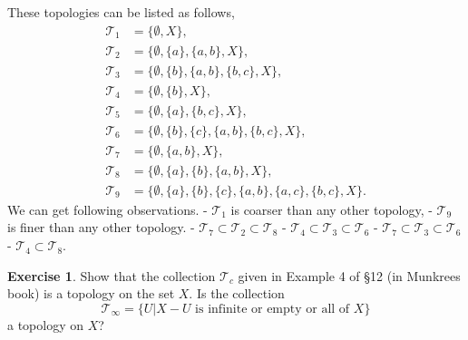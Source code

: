 \documentclass[
]{book}
\theoremstyle{definition}
\theoremstyle{definition}
\theoremstyle{definition}
\newtheorem{exercise}{Exercise}[chapter]
\theoremstyle{definition}
\theoremstyle{remark}
\begin{document}
These topologies can be listed as follows,
\begin{align*}
\mathcal{T}_1 &= \{\emptyset, X\}, \\
\mathcal{T}_2 &= \{\emptyset, \{a\}, \{a, b\}, X\}, \\
\mathcal{T}_3 &= \{\emptyset, \{b\}, \{a, b\}, \{b, c\}, X\}, \\
\mathcal{T}_4 &= \{\emptyset, \{b\}, X\}, \\
\mathcal{T}_5 &= \{\emptyset, \{a\}, \{b, c\}, X\}, \\
\mathcal{T}_6 &= \{\emptyset, \{b\}, \{c\}, \{a, b\}, \{b, c\}, X\}, \\
\mathcal{T}_7 &= \{\emptyset, \{a, b\}, X\}, \\
\mathcal{T}_8 &= \{\emptyset, \{a\}, \{b\}, \{a, b\}, X\}, \\
\mathcal{T}_9 &= \{\emptyset, \{a\}, \{b\}, \{c\}, \{a, b\}, \{a, c\}, \{b, c\}, X\}.
\end{align*}
We can get following observations.
- \(\mathcal{T}_1\) is coarser than any other topology,
- \(\mathcal{T}_9\) is finer than any other topology.
- \(\mathcal{T}_7 \subset \mathcal{T}_2 \subset \mathcal{T}_8\)
- \(\mathcal{T}_4 \subset \mathcal{T}_3 \subset \mathcal{T}_6\)
- \(\mathcal{T}_7 \subset \mathcal{T}_3 \subset \mathcal{T}_6\)
- \(\mathcal{T}_4 \subset \mathcal{T}_8\).

\begin{exercise}
\protect\hypertarget{exr:unnamed-chunk-98}{}\label{exr:unnamed-chunk-98}Show that the collection \(\mathcal{T}_c\) given in Example 4 of §12 (in Munkrees book) is a topology on the set \(X\).
Is the collection
\[\mathcal{T}_{\infty} = \{U | X - U \text{ is infinite or empty or all of } X\}\]
a topology on \(X\)?
\end{exercise}
\end{document}
